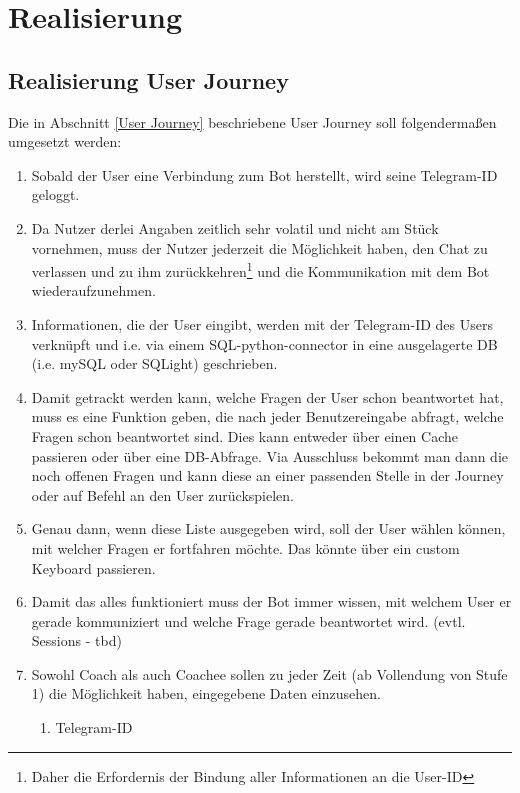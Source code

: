 \label{Realisierung}
\chapter{Realisierung}

    \section{Realisierung User Journey}

    Die in Abschnitt \ref{User Journey} beschriebene User Journey soll folgendermaßen umgesetzt werden:

    \begin{enumerate}
        \item Sobald der User eine Verbindung zum Bot herstellt, wird seine Telegram-ID geloggt.
        \item Da Nutzer derlei Angaben zeitlich sehr volatil und nicht am Stück vornehmen, muss der Nutzer jederzeit die Möglichkeit haben, den Chat zu verlassen und zu ihm zurückkehren\footnote{Daher die Erfordernis der Bindung aller Informationen an die User-ID} und die Kommunikation mit dem Bot wiederaufzunehmen.
        \item Informationen, die der User eingibt, werden mit der Telegram-ID des Users verknüpft und i.e. via einem SQL-python-connector in eine ausgelagerte DB (i.e. mySQL oder SQLight) geschrieben.
        \item Damit getrackt werden kann, welche Fragen der User schon beantwortet hat, muss es eine Funktion geben, die nach jeder Benutzereingabe abfragt, welche Fragen schon beantwortet sind. Dies kann entweder über einen Cache passieren oder über eine DB-Abfrage. Via Ausschluss bekommt man dann die noch offenen Fragen und kann diese an einer passenden Stelle in der Journey oder auf Befehl an den User zurückspielen.
        \item Genau dann, wenn diese Liste ausgegeben wird, soll der User wählen können, mit welcher Fragen er fortfahren möchte. Das könnte über ein custom Keyboard passieren.
        \item Damit das alles funktioniert muss der Bot immer wissen, mit welchem User er gerade kommuniziert und welche Frage gerade beantwortet wird. (evtl. Sessions - tbd)
        \item Sowohl Coach als auch Coachee sollen zu jeder Zeit (ab Vollendung von Stufe 1) die Möglichkeit haben, eingegebene Daten einzusehen.
        \begin{enumerate}
            \item Telegram-ID

\end{enumerate}
\end{enumerate}
